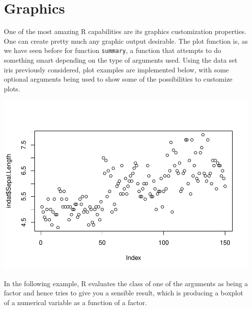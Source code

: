 \documentclass[
]{article}
\newenvironment{Shaded}{\begin{snugshade}}{\end{snugshade}}
\newcommand{\CommentTok}[1]{\textcolor[rgb]{0.56,0.35,0.01}{\textit{#1}}}
\newcommand{\FunctionTok}[1]{\textcolor[rgb]{0.13,0.29,0.53}{\textbf{#1}}}
\newcommand{\NormalTok}[1]{#1}
\newcommand{\OtherTok}[1]{\textcolor[rgb]{0.56,0.35,0.01}{#1}}
\newcommand{\SpecialCharTok}[1]{\textcolor[rgb]{0.81,0.36,0.00}{\textbf{#1}}}
\begin{document}
\section{Graphics}\label{graphics}

One of the most amazing R capabilities are its graphics customization
properties. One can create pretty much any graphic output desirable. The
plot function is, as we have seen before for function \texttt{summary},
a function that attempts to do something smart depending on the type of
arguments used. Using the data set iris previously considered, plot
examples are implemented below, with some optional arguments being used
to show some of the possibilities to customize plots.

\begin{Shaded}
\end{Shaded}

\includegraphics{TAMsIntro2RviaRStudioTutorial_files/figure-latex/unnamed-chunk-48-1.pdf}

In the following example, R evaluates the class of one of the arguments
as being a factor and hence tries to give you a sensible result, which
is producing a boxplot of a numerical variable as a function of a
factor.

\begin{Shaded}
\end{Shaded}
\end{document}

